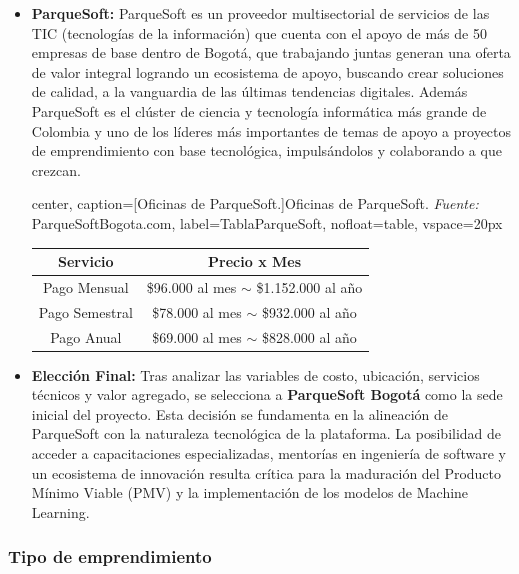 \begin{itemize}
	\item \textbf{ParqueSoft:} ParqueSoft es un proveedor multisectorial de servicios de las TIC (tecnologías de la información) que cuenta con el apoyo de más de 50 empresas de base dentro de Bogotá, que trabajando juntas generan una oferta de valor integral logrando un ecosistema de apoyo, buscando crear soluciones de calidad, a la vanguardia de las últimas tendencias digitales. Además ParqueSoft es el clúster de ciencia y tecnología informática más grande de Colombia y uno de los líderes más importantes de temas de apoyo a proyectos de emprendimiento con base tecnológica, impulsándolos y colaborando a que crezcan.
	
	\begin{adjustbox}{
			center,
			caption=[{Oficinas de ParqueSoft.}]{\centering Oficinas de ParqueSoft. \textit{Fuente:} ParqueSoftBogota.com},
			label={TablaParqueSoft},
			nofloat=table, vspace={20px}}
			\begin{tabular}{|c|c|}
				\hline
				\rowcolor[HTML]{D9EAD3} 
				\textbf{Servicio} & \textbf{Precio x Mes} \\ \hline
				Pago Mensual & \$96.000 al mes $\sim$ \$1.152.000 al año \\ \hline
				Pago Semestral & \$78.000 al mes $\sim$ \$932.000 al año \\ \hline
				Pago Anual & \$69.000 al mes $\sim$ \$828.000 al año \\ \hline
			\end{tabular}
	\end{adjustbox}

	\item \textbf{Elección Final:} Tras analizar las variables de costo, ubicación, servicios técnicos y valor agregado, se selecciona a \textbf{ParqueSoft Bogotá} como la sede inicial del proyecto. Esta decisión se fundamenta en la alineación de ParqueSoft con la naturaleza tecnológica de la plataforma. La posibilidad de acceder a capacitaciones especializadas, mentorías en ingeniería de software y un ecosistema de innovación resulta crítica para la maduración del Producto Mínimo Viable (PMV) y la implementación de los modelos de Machine Learning.
	
\end{itemize}

{}
\subsubsection*{Tipo de emprendimiento}


